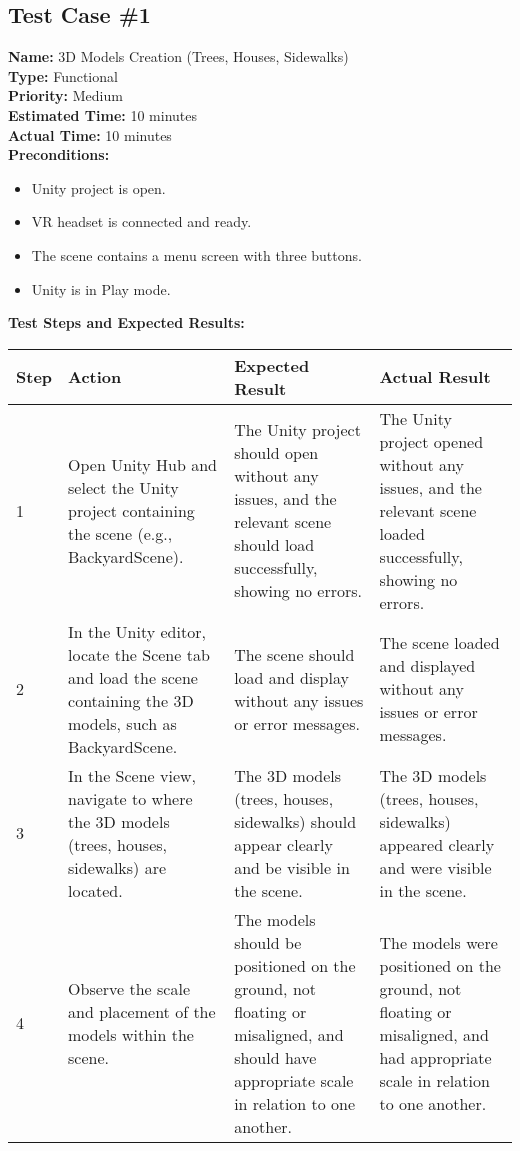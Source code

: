 \documentclass[11pt]{article}
\begin{document}
\subsection{Test Case \#1}
\textbf{Name:} 3D Models Creation (Trees, Houses, Sidewalks)\\
\textbf{Type:} Functional \\
\textbf{Priority:} Medium \\
\textbf{Estimated Time:} 10 minutes \\
\textbf{Actual Time:} 10 minutes \\
\textbf{Preconditions:} 
\begin{itemize}
\item Unity project is open.
\item VR headset is connected and ready.
\item The scene contains a menu screen with three buttons.
\item Unity is in Play mode.
\end{itemize}
\textbf{Test Steps and Expected Results:} \\
\begin{tabular}{@{} p{0.8cm} p{4.6cm} p{4.6cm} p{4.6cm} @{}}
\toprule
\textbf{Step} & \textbf{Action} & \textbf{Expected Result} & \textbf{Actual Result} \\
\midrule
1 & Open Unity Hub and select the Unity project containing the scene (e.g., BackyardScene). & The Unity project should open without any issues, and the relevant scene should load successfully, showing no errors. & The Unity project opened without any issues, and the relevant scene loaded successfully, showing no errors. \\
2 & In the Unity editor, locate the Scene tab and load the scene containing the 3D models, such as BackyardScene. & The scene should load and display without any issues or error messages. & The scene loaded and displayed without any issues or error messages. \\
3 & In the Scene view, navigate to where the 3D models (trees, houses, sidewalks) are located. & The 3D models (trees, houses, sidewalks) should appear clearly and be visible in the scene. & The 3D models (trees, houses, sidewalks) appeared clearly and were visible in the scene. \\
4 & Observe the scale and placement of the models within the scene. & The models should be positioned on the ground, not floating or misaligned, and should have appropriate scale in relation to one another. & The models were positioned on the ground, not floating or misaligned, and had appropriate scale in relation to one another. \\
\bottomrule
\end{tabular}
\end{document}
